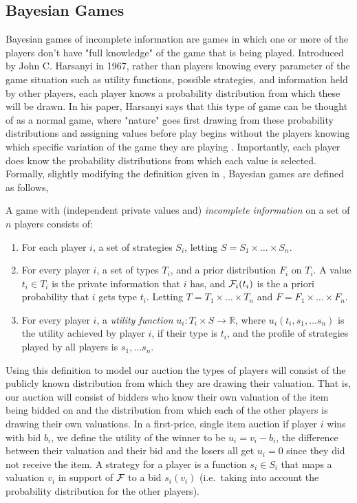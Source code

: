 \documentclass[12pt,twoside]{reedthesis}
\begin{document}
\subsection{Bayesian Games}
Bayesian games of incomplete information are games in which one or more of the players don't have "full knowledge" of the game that is being played. Introduced by John C. Harsanyi in 1967, rather than players knowing every parameter of the game situation such as utility functions, possible strategies, and information held by other players, each player knows a probability distribution from which these will be drawn. In his paper, Harsanyi says that this type of game can be thought of as a normal game, where "nature" goes first drawing from these probability distributions and assigning values before play begins without the players knowing which specific variation of the game they are playing \citep{Harsanyi1967}. Importantly, each player does know the probability distributions from which each value is selected. Formally, slightly modifying the definition given in \citet{Nisan2007}, Bayesian games are defined as follows,

\begin{dfn}
	A game with (independent private values and) \textit{incomplete information} on a set of $n$ players consists of:
	\begin{enumerate}
		\item For each player $i$, a set of strategies $S_i$, letting $S = S_1 \times \ldots \times S_n$.
		\item For every player $i$, a set of types $T_i$, and a prior distribution $F_i$ on $T_i$. A value $t_i \in T_i$ is the private information that $i$ has, and $\mathcal{F}_i(t_i)$ is the a priori probability that $i$ gets type $t_i$. Letting $T = T_1 \times \ldots \times T_n$ and $F = F_1 \times \ldots \times F_n$.
		\item For every player $i$, a \textit{utility function} $u_i : T_i \times S \rightarrow \mathbb{R}$, where $u_i(t_i, s_1, \ldots s_n)$ is the utility achieved by player $i$, if their type is $t_i$, and the profile of strategies played by all players is $s_1, \ldots s_n$.
	\end{enumerate} 
\end{dfn} 

Using this definition to model our auction the types of players will consist of the publicly known distribution from which they are drawing their valuation. That is, our auction will consist of bidders who know their own valuation of the item being bidded on and the distribution from which each of the other players is drawing their own valuations. In a first-price, single item auction if player $i$ wins with bid $b_i$, we define the utility of the winner to be $u_i = v_i - b_i$, the difference between their valuation and their bid and the losers all get $u_i = 0$ since they did not receive the item. A strategy for a player is a function $s_i \in S_i$ that maps a valuation $v_i$ in support of $\mathcal{F}$ to a bid $s_i(v_i)$ (i.e.~taking into account the probability distribution for the other players). %
\end{document}
